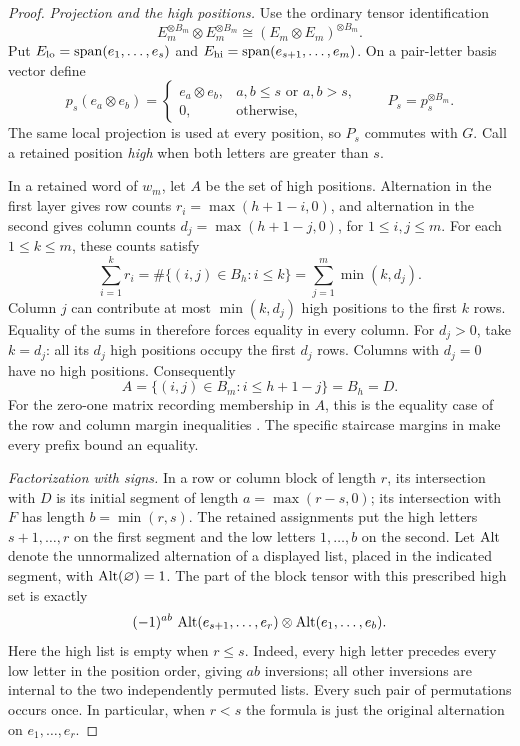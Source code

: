 \begin{proof}
\emph{Projection and the high positions.}
Use the ordinary tensor identification
\[
 E_m^{\otimes B_m}\otimes E_m^{\otimes B_m}
 \cong (E_m\otimes E_m)^{\otimes B_m}.
\]
Put $E_{\mathrm{lo}}=\operatorname{span}(e_1,\ldots,e_s)$ and
$E_{\mathrm{hi}}=\operatorname{span}(e_{s+1},\ldots,e_m)$.
On a pair-letter basis vector define
\[
 p_s(e_a\otimes e_b)=
 \begin{cases}
 e_a\otimes e_b,& a,b\le s\text{ or }a,b>s,\\
 0,&\text{otherwise},
 \end{cases}
 \qquad P_s=p_s^{\otimes B_m}.
\]
The same local projection is used at every position, so $P_s$
commutes with $G$.  Call a retained position \emph{high} when both
letters are greater than $s$.

In a retained word of $w_m$, let $A$ be the set of high positions.
Alternation in the first layer gives row counts
$r_i=\max(h+1-i,0)$, and alternation in the second gives column
counts $d_j=\max(h+1-j,0)$, for $1\le i,j\le m$.
For each $1\le k\le m$, these counts satisfy
\begin{equation}\label{band:margin-equality}
 \sum_{i=1}^k r_i
 =\#\{(i,j)\in B_h:i\le k\}
 =\sum_{j=1}^m\min(k,d_j).
\end{equation}
Column $j$ can contribute at most $\min(k,d_j)$ high positions to
the first $k$ rows.  Equality of the sums in
 therefore forces equality in every column.
For $d_j>0$, take $k=d_j$: all its $d_j$ high positions occupy the
first $d_j$ rows.  Columns with $d_j=0$ have no high positions.
Consequently
\begin{equation}\label{band:unique-high-set}
 A=\{(i,j)\in B_m:i\le h+1-j\}=B_h=D.
\end{equation}
For the zero-one matrix recording membership in $A$, this is the
equality case of the row and column margin inequalities
\cite[Section~2]{ryser1957}. The specific staircase margins in
 make every prefix bound an equality.

\emph{Factorization with signs.}
In a row or column block of length $r$, its intersection with $D$
is its initial segment of length $a=\max(r-s,0)$; its intersection
with $F$ has length $b=\min(r,s)$.
The retained assignments put the high letters $s+1,\ldots,r$ on
the first segment and the low letters $1,\ldots,b$ on the second.
Let $\operatorname{Alt}$ denote the unnormalized alternation of a displayed list,
placed in the indicated segment, with $\operatorname{Alt}(\varnothing)=1$.
The part of the block tensor with this prescribed high set is exactly
\begin{equation}\label{band:block-factorization}
 (-1)^{ab}\,
 \operatorname{Alt}(e_{s+1},\ldots,e_r)\otimes\operatorname{Alt}(e_1,\ldots,e_b).
\end{equation}
Here the high list is empty when $r\le s$.
Indeed, every high letter precedes every low letter in the position
order, giving $ab$ inversions; all other inversions are internal to
the two independently permuted lists.  Every such pair of permutations
occurs once.  In particular, when $r<s$ the formula is just the
original alternation on $e_1,\ldots,e_r$.


\end{proof}
